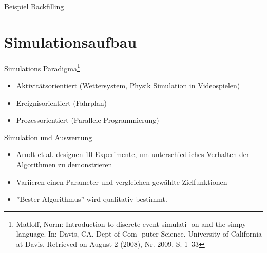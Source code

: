 \documentclass[aspectratio=169,10pt]{beamer}
\begin{document}
\begin{frame}[t, fragile]{Beispiel Backfilling}
\end{frame}



\section{Simulationsaufbau}

\begin{frame}[t, fragile]{Simulations Paradigma\footnote{Matloff, Norm: Introduction to discrete-event simulati-
		on and the simpy language. In: Davis, CA. Dept of Com-
		puter Science. University of California at Davis. Retrieved on
		August 2 (2008), Nr. 2009, S. 1–33}}
	\begin{itemize}
		\item Aktivit\"atsorientiert (Wettersystem, Physik Simulation in Videospielen)
		\item \alert{Ereignisorientiert} (Fahrplan)
		\item Prozessorientiert (Parallele Programmierung)
	\end{itemize}
\end{frame}

\begin{frame}[t, fragile]{Simulation und Auswertung}
	\begin{itemize}
		\item Arndt et al. \alert{designen 10 Experimente}, um unterschiedliches Verhalten der Algorithmen zu demonstrieren
		\item Variieren einen Parameter und vergleichen gew\"ahlte Zielfunktionen
		\item ''Bester Algorithmus'' wird \alert{qualitativ} bestimmt.
	\end{itemize}
\end{frame}
\end{document}
